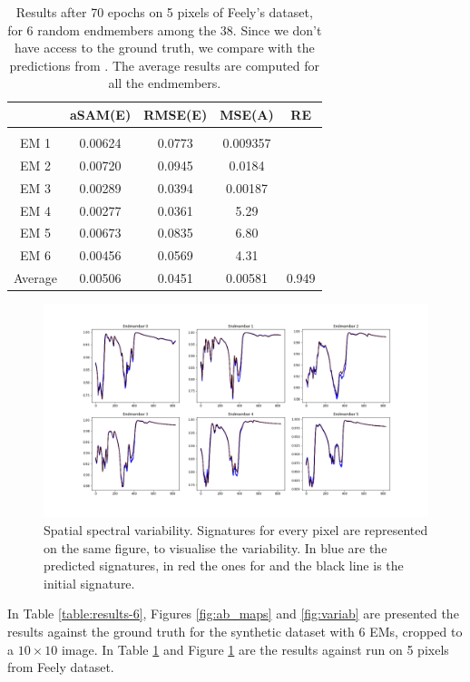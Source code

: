 \documentclass{article}
\begin{document}
\begin{table}
\centering
\begin{tabular}{ccccc}
{} & {\bf aSAM(E)} & {\bf RMSE(E)} & {\bf MSE(A)} & {\bf RE} \\
\hline & \\[-1.5ex]
EM 1 & 0.00624 & 0.0773 & 0.009357 &  \\
EM 2 & 0.00720 & 0.0945 & 0.0184 &   \\
EM 3 & 0.00289 & 0.0394 & 0.00187 &   \\
EM 4 & 0.00277 & 0.0361 & 5.29 &  \\
EM 5 & 0.00673 & 0.0835 & 6.80 &  \\
EM 6 & 0.00456 & 0.0569 & 4.31 &  \\
Average & 0.00506 & 0.0451 & 0.00581 & 0.949 \\
\end{tabular}
\caption{Results after 70 epochs on 5 pixels of Feely's dataset, for 6 random endmembers among the 38. Since we don't have access to the ground truth, we compare with the predictions from \citet{janiczek_differentiable_2020}. The average results are computed for all the endmembers.}
\label{table:results-f}
\end{table}

\begin{figure}[]
    \centering
    \includegraphics[width=\textwidth]{pictures/spectral_variab_f.png}
    \caption{Spatial spectral variability. Signatures for every pixel are represented on the same figure, to visualise the variability. In blue are the predicted signatures, in red the ones for \citet{janiczek_differentiable_2020} and the black line is the initial signature.}
    \label{fig:variab-f}
\end{figure}

In Table \ref{table:results-6}, Figures \ref{fig:ab_maps} and \ref{fig:variab} are presented the results against the ground truth for the synthetic dataset with 6 EMs, cropped to a $10 \times 10$ image. In Table \ref{table:results-f} and Figure \ref{fig:variab-f} are the results against \citet{janiczek_differentiable_2020} run on 5 pixels from Feely dataset.
\end{document}
